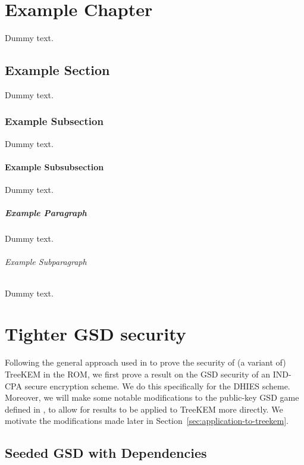 \chapter{Example Chapter}

Dummy text.

\section{Example Section}

Dummy text.

\subsection{Example Subsection}

Dummy text.

\subsubsection{Example Subsubsection}

Dummy text.

\paragraph{Example Paragraph}

Dummy text.

\subparagraph{Example Subparagraph}

Dummy text.

\chapter{Tighter GSD security}


Following the general approach used in \cite{ttkem} to prove the security of (a variant of) TreeKEM in the ROM, we first prove a result on the GSD security of an IND-CPA secure encryption scheme. We do this specifically for the DHIES scheme. Moreover, we will make some notable modifications to the public-key GSD game defined in \cite{ttkem}, to allow for results to be applied to TreeKEM more directly. We motivate the modifications made later in Section~\vref{sec:application-to-treekem}.

\section{Seeded GSD with Dependencies}

